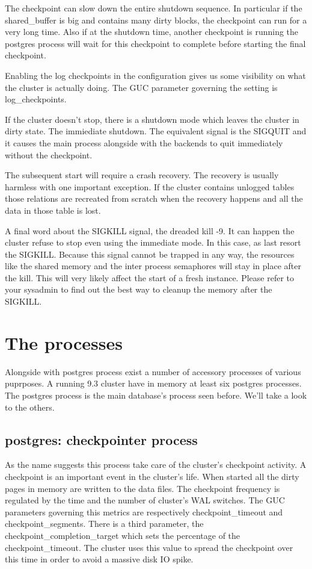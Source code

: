 The checkpoint can slow down the entire shutdown sequence. In particular if the shared\_buffer is
big and contains many dirty blocks, the checkpoint can run for a very long time. Also if at
the shutdown time, another checkpoint is running the postgres process will wait for this
checkpoint to complete before starting the final checkpoint.\newline

Enabling the log checkpoints in the configuration gives us some visibility on what the cluster is
actually doing. The GUC parameter governing the setting is log\_checkpoints.\newline


If the cluster doesn't stop, there is a shutdown mode which leaves the cluster in dirty state.
The immiediate shutdown. The equivalent signal is the SIGQUIT and it causes the main process
alongside with the backends to quit immediately without the checkpoint.\newline

The subsequent start will require a crash recovery. The recovery is usually harmless with one
important exception. If the cluster contains unlogged tables those relations are recreated from
scratch when the recovery happens and all the data in those table is lost.

A final word about the SIGKILL signal, the dreaded kill -9. It can happen the cluster refuse to
stop even using the immediate mode. In this case, as last resort the SIGKILL. Because this signal
cannot be trapped in any way, the resources like the shared memory and the inter process semaphores
will stay in place after the kill. This will very likely affect the start of a fresh instance.
Please refer to your sysadmin to find out the best way to cleanup the memory after the
SIGKILL.

\section{The processes}
\label{sec:PROCESSES}
Alongside with postgres process exist a number of accessory processes of various puprposes. A
running 9.3 cluster have in memory at least six postgres processes. The postgres process is the main
database's process seen before. We'll take a look to the others.

\subsection{postgres: checkpointer process}
As the name suggests this process take care of the cluster's 
checkpoint activity. A checkpoint is an important event in the 
cluster's life. When started all the dirty pages in memory are written to the data files. 
The checkpoint frequency is regulated by the time and the number of cluster's WAL switches.
The GUC parameters governing this metrics are respectively checkpoint\_timeout and 
checkpoint\_segments. There is a third parameter, the checkpoint\_completion\_target which sets
the percentage of the checkpoint\_timeout. The cluster uses this value to spread the checkpoint
over this time in order to avoid a massive disk IO spike.


